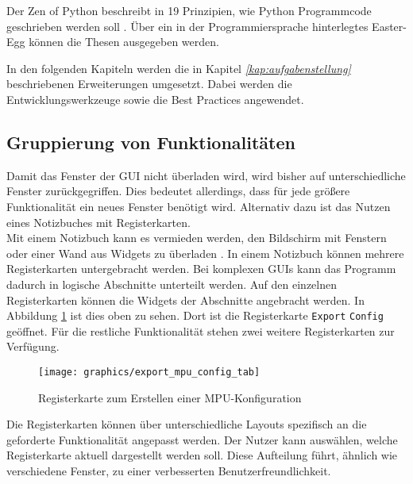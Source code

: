 \begin{description}[style=nextline]
	\item[Zen of Python] Der Zen of Python beschreibt in 19 Prinzipien, wie Python Programmcode geschrieben werden soll \cite{inet:pep20}.
	Über ein in der Programmiersprache hinterlegtes Easter-Egg können die Thesen ausgegeben werden.
\end{description}

In den folgenden Kapiteln werden die in Kapitel \textit{\ref{kap:aufgabenstellung} } beschriebenen Erweiterungen umgesetzt.
Dabei werden die Entwicklungswerkzeuge sowie die Best Practices angewendet.

\subsection{Gruppierung von Funktionalitäten}\label{kap:aufteilung_registerkarten}
Damit das Fenster der \ac{GUI} nicht überladen wird, wird bisher auf unterschiedliche Fenster zurückgegriffen.
Dies bedeutet allerdings, dass für jede größere Funktionalität ein neues Fenster benötigt wird.
Alternativ dazu ist das Nutzen eines Notizbuches mit Registerkarten. \\

Mit einem Notizbuch kann es vermieden werden, den Bildschirm mit Fenstern oder einer Wand aus Widgets zu überladen \cite{skript:wegner09}.
In einem Notizbuch können mehrere Registerkarten untergebracht werden.
Bei komplexen \ac{GUI}s kann das Programm dadurch in logische Abschnitte unterteilt werden.
Auf den einzelnen Registerkarten können die Widgets der Abschnitte angebracht werden.
In Abbildung \ref{fig:exportmpuconfigtab} ist dies oben zu sehen.
Dort ist die Registerkarte \verb*|Export| \verb*|Config| geöffnet.
Für die restliche Funktionalität stehen zwei weitere Registerkarten zur Verfügung.\\

\begin{figure}[H]
	\centering
	\texttt{[image: graphics/export\_mpu\_config\_tab]}
	\caption{Registerkarte zum Erstellen einer \acs{MPU}-Konfiguration}
	\label{fig:exportmpuconfigtab}
\end{figure}

Die Registerkarten können über unterschiedliche Layouts spezifisch an die geforderte Funktionalität angepasst werden.
Der Nutzer kann auswählen, welche Registerkarte aktuell dargestellt werden soll.
Diese Aufteilung führt, ähnlich wie verschiedene Fenster, zu einer verbesserten Benutzerfreundlichkeit. \\

